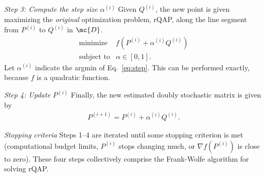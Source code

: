 \documentclass{article} %
\begin{document}
\emph{Step 3: Compute the step size $\alpha^{(i)}$} Given $Q^{(i)}$, the new point is given maximizing the \emph{original} optimization problem, rQAP, along the line segment from $P^{(i)}$ to $Q^{(i)}$ in $\mc{D}$.    
% 
% 
% 
\begin{equation}
\begin{array}{cl}
			\text{minimize}   & f(P^{(i)} + \alpha^{(i)} Q^{(i)}) \\
			\text{subject to}  & \alpha \in [0,1].   
\end{array} \label{eq:step}
\end{equation}
Let $\alpha^{(i)}$ indicate the argmin of Eq.~\eqref{eq:step}.
This can be performed exactly, because $f$ is a quadratic function.  


\emph{Step 4: Update $P^{(i)}$} Finally, the new estimated doubly stochastic matrix is given by
\begin{align} \label{eq:update}
	P^{(i+1)} = P^{(i)} + \alpha^{(i)} Q^{(i)}.
\end{align}


\emph{Stopping criteria} Steps 1--4 are iterated until some stopping criterion is met (computational budget limits, $P^{(i)}$ stops changing much, or $\nabla f(P^{(i)})$ is close to zero).  These four steps collectively comprise the Frank-Wolfe algorithm for solving rQAP.  %
\end{document}
